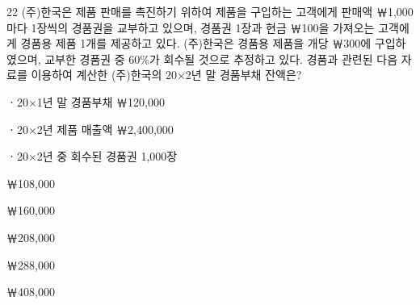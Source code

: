 \begin{question}{22}
(주)한국은 제품 판매를 촉진하기 위하여 제품을 구입하는 고객에게 판매액 ￦1,000마다 1장씩의 경품권을 교부하고 있으며, 경품권 1장과 현금 ￦100을 가져오는 고객에게 경품용 제품 1개를 제공하고 있다. (주)한국은 경품용 제품을 개당 ￦300에 구입하였으며, 교부한 경품권 중 60\%가 회수될 것으로 추정하고 있다. 경품과 관련된 다음 자료를 이용하여 계산한 (주)한국의 20×2년 말 경품부채 잔액은?
\begin{framedtext}
ㆍ20×1년 말 경품부채 ￦120,000 \par
ㆍ20×2년 제품 매출액 ￦2,400,000 \par
ㆍ20×2년 중 회수된 경품권 1,000장 \par
\end{framedtext}
\begin{choices}
  \item ￦108,000
  \item ￦160,000
  \item ￦208,000
  \item ￦288,000
  \item ￦408,000
\end{choices}
\end{question}
